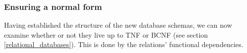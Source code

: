 \subsubsection*{Ensuring a normal form}
Having established the structure of the new database schemas, we can now examine whether or not they live up to TNF or BCNF (see section \ref{relational_databases}).
This is done by the relations' functional dependencies.